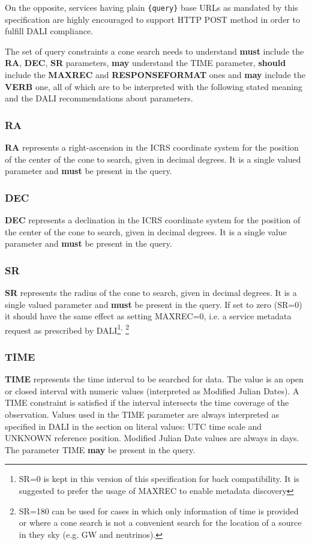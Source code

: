 \documentclass[11pt,a4paper]{ivoa}
\begin{document}
On the opposite, services having plain \texttt{\{query\}} base URLs as
mandated by this specification are highly encouraged to support HTTP
POST method in order to fulfill DALI compliance.

The set of query constraints a cone search needs to understand
\textbf{must} include the \textbf{RA}, \textbf{DEC}, \textbf{SR}
parameters, \textbf{may} understand the TIME parameter,
\textbf{should} include the \textbf{MAXREC} and \textbf{RESPONSEFORMAT}
ones and \textbf{may} include the \textbf{VERB} one, all of which are to
be interpreted with the following stated meaning and the DALI
recommendations about parameters.

\subsubsection{RA} \textbf{RA} represents a right-ascension in the ICRS
coordinate system for the position of the center of the cone to search,
given in decimal degrees. It is a single valued parameter and
\textbf{must} be present in the query.

\subsubsection{DEC} \textbf{DEC} represents a declination in the ICRS
coordinate system for the position of the center of the cone to search,
given in decimal degrees. It is a single value parameter and
\textbf{must} be present in the query.

\subsubsection{SR} \textbf{SR} represents the radius of the cone to
search, given in decimal degrees. It is a single valued parameter and
\textbf{must} be present in the query. If set to zero (SR=0) it should
have the same effect as setting MAXREC=0, i.e. a service metadata
request as prescribed by DALI\footnote{SR=0 is kept in this version of
this specification for back compatibility. It is suggested to prefer the
usage of MAXREC to enable metadata discovery}\textsuperscript{,
}\footnote{SR=180 can be used for cases in which only information of
time is provided or where a cone search is not a convenient search for
the location of a source in they sky (e.g. GW and neutrinos).}

\subsubsection{TIME} \textbf{TIME} represents the time interval to be
searched for data. The value is an open or closed interval with numeric
values (interpreted as Modified Julian Dates). A TIME constraint is
satisfied if the interval intersects the time coverage of the
observation. Values used in the TIME parameter are always interpreted as
specified in DALI in the section on literal values: UTC time scale and
UNKNOWN reference position. Modified Julian Date values are always in
days. The parameter TIME \textbf{may} be present in the query. 
\end{document}
